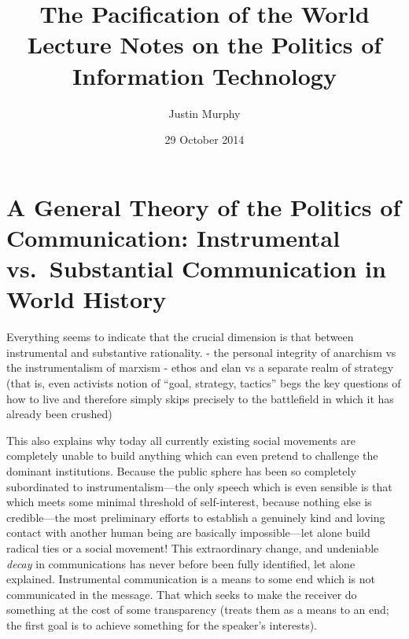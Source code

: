 \documentclass[12pt,book]{article}
\title{The Pacification of the World Lecture Notes on the Politics of
Information Technology}
\author{Justin Murphy}
\date{29 October 2014}
\begin{document}
\maketitle


{
\hypersetup{linkcolor=black}
\setcounter{tocdepth}{2}
\tableofcontents
}
\pagebreak

\section{A General Theory of the Politics of Communication: Instrumental
vs.~Substantial Communication in World
History}\label{a-general-theory-of-the-politics-of-communication-instrumental-vs.substantial-communication-in-world-history}

Everything seems to indicate that the crucial dimension is that between
instrumental and substantive rationality. - the personal integrity of
anarchism vs the instrumentalism of marxism - ethos and elan vs a
separate realm of strategy (that is, even activists notion of ``goal,
strategy, tactics'' begs the key questions of how to live and therefore
simply skips precisely to the battlefield in which it has already been
crushed)

This also explains why today all currently existing social movements are
completely unable to build anything which can even pretend to challenge
the dominant institutions. Because the public sphere has been so
completely subordinated to instrumentalism---the only speech which is
even sensible is that which meets some minimal threshold of
self-interest, because nothing else is credible---the most preliminary
efforts to establish a genuinely kind and loving contact with another
human being are basically impossible---let alone build radical ties or a
social movement! This extraordinary change, and undeniable \emph{decay}
in communications has never before been fully identified, let alone
explained. Instrumental communication is a means to some end which is
not communicated in the message. That which seeks to make the receiver
do something at the cost of some transparency (treats them as a means to
an end; the first goal is to achieve something for the speaker's
interests).
\end{document}
